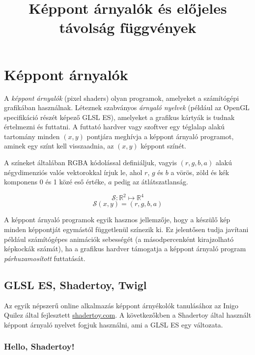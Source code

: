 

\title{Képpont árnyalók és előjeles távolság függvények}


\maketitle

\section{Képpont árnyalók}

\begin{tcolorbox}[title=Képpont árnyalók]
A \emph{képpont árnyalók} (pixel shaders) olyan programok, amelyeket a számítógépi grafikában használnak.
Léteznek szabványos \emph{árnyaló nyelvek} (például az OpenGL specifikáció részét képező GLSL ES),
amelyeket a grafikus kártyák
is tudnak értelmezni és futtatni. A futtató hardver vagy szoftver egy téglalap alakú tartomány
minden $(x,y)$ pontjára meghívja a képpont árnyaló programot, aminek egy színt kell visszaadnia,
az $(x,y)$ képpont színét.

A színeket általában RGBA kódolással definiáljuk, vagyis $(r, g, b, a)$ alakú négydimenziós
valós vektorokkal írjuk le, ahol $r$, $g$ és $b$ a vörös, zöld és kék komponens 0 és 1 közé eső
értéke, $a$ pedig az átlátszatlanság.

$$\mathcal{S}: \mathbb{R}^2 \mapsto \mathbb{R}^4$$
$$\mathcal{S}(x, y) = (r, g, b, a)$$
\end{tcolorbox}

A képpont árnyaló programok egyik hasznos jellemzője, hogy a készülő kép minden képpontját
egymástól függetlenül színezik ki. Ez jelentősen tudja javítani például számítógépes animációk
sebességét (a másodpercenként kirajzolható képkockák számát), ha a grafikus hardver támogatja
a képpont árnyaló program \emph{párhuzamosított} futtatását.

\subsection{GLSL ES, Shadertoy, Twigl}

Az egyik népszerű online alkalmazás képpont árnyékolók tanulásához az Inigo Quilez által fejlesztett
\url{shadertoy.com}. A következőkben a Shadertoy által használt képpont árnyaló nyelvet fogjuk használni,
ami a GLSL ES egy változata.

\subsubsection{Hello, Shadertoy!}

